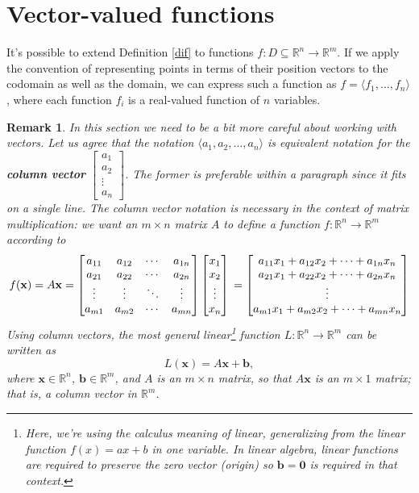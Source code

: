 \documentclass[12pt,letterpaper]{article}
\newtheorem{rem}[theorem]{Remark}
\newenvironment{remark}{\begin{rem}\rm}{\end{rem}}
\newcommand{\R}{\mathbb{R}}
\newcommand{\x}{\mathbf{x}}
\newcommand{\bbb}{\mathbf{b}}
\begin{document}
\section{Vector-valued functions}
It's possible to extend Definition \ref{dif} to functions $f:D\subseteq \R^n\to \R^m$. If we apply the convention of representing points in terms of their position vectors to the codomain as well as the domain, we can express such a function as $f=\langle f_1,\ldots, f_n\rangle$, where each function $f_i$ is a real-valued function of $n$ variables. 
\begin{remark}
 In this section we need to be a bit more careful about working with vectors. Let us agree that the notation $\langle a_1,a_2,\ldots, a_n\rangle$ is equivalent notation for the {\bf column vector} $\begin{bmatrix}a_1\\a_2\\ \vdots\\a_n\end{bmatrix}$. The former is preferable within a paragraph since it fits on a single line. The column vector notation is necessary in the context of matrix multiplication: we want an $m\times n$ matrix $A$ to define a function $f:\R^n\to \R^m$ according to
\[
 f(\x) = A\x = \begin{bmatrix}a_{11} & a_{12} & \cdots & a_{1n}\\
                a_{21} & a_{22} & \cdots & a_{2n}\\
		\vdots & \vdots & \ddots & \vdots\\
		a_{m1} & a_{m2} & \cdots & a_{mn}
               \end{bmatrix}\begin{bmatrix}x_1\\x_2\\ \vdots \\x_n\end{bmatrix}\\
=\begin{bmatrix}a_{11}x_1+a_{12}x_2+\cdots + a_{1n}x_n\\ a_{21}x_1+a_{22}x_2+\cdots + a_{2n}x_n\\ \vdots\\ a_{m1}x_1+a_{m2}x_2+\cdots + a_{mn}x_n\end{bmatrix}
\]
Using column vectors, the most general linear\footnote{Here, we're using the calculus meaning of linear, generalizing from the linear function $f(x)=ax+b$ in one variable. In linear algebra, linear functions are required to preserve the zero vector (origin) so $\bbb=\mathbf{0}$ is required in that context.} function $L:\R^n\to \R^m$ can be written as
\[
 L(\x) = A\x + \bbb,
\]
where $\x\in\R^n$, $\bbb\in\R^m$, and $A$ is an $m\times n$ matrix, so that $A\x$ is an $m\times 1$ matrix; that is, a column vector in $\R^m$.
\end{remark}
\end{document}
